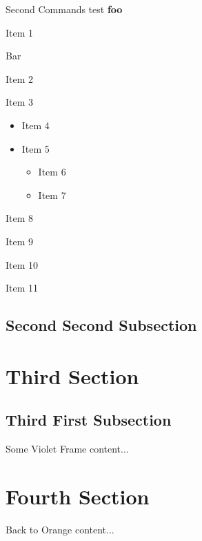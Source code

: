 \documentclass[aspectratio=169]{beamer}
\begin{document}
\begin{frame}{Second Commands test}
	\textbf{foo}
	\begin{vfilleditems}
		\item Item 1
		\item \alert{Bar}
	\end{vfilleditems}
	\begin{fixedvfilleditems}
		\item Item 2
		\item Item 3
		\begin{itemize}
			\item Item 4
			\item Item 5
			\begin{itemize}
				\item Item 6
				\item Item 7
			\end{itemize}
		\end{itemize}
		\item Item 8
		\item Item 9
		\item Item 10
		\item Item 11
	\end{fixedvfilleditems}
\end{frame}

\subsection{Second Second Subsection}


\section{Third Section}

\subsection{Third First Subsection}

\begin{frame}{Some Violet Frame}
	content...
\end{frame}

\resetdefaultcolor

\section{Fourth Section}

\begin{frame}{Back to Orange}
	content...
\end{frame}
\end{document}
